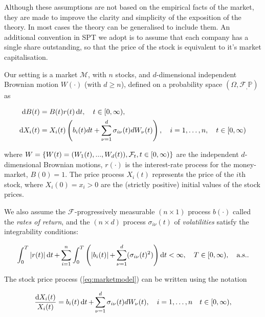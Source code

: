 \documentclass[british]{amsart} \usepackage{lmodern}
\numberwithin{equation}{section} \numberwithin{figure}{section}
\theoremstyle{plain} \newtheorem{thm}{\protect\theoremname}[section]
\theoremstyle{definition} \newtheorem{defn}[thm]{\protect\definitionname}
\theoremstyle{plain} \newtheorem{assumption}[thm]{\protect\assumptionname}
\theoremstyle{plain} \newtheorem{lem}[thm]{\protect\lemmaname}
\theoremstyle{plain} \newtheorem{prop}[thm]{\protect\propositionname}
\theoremstyle{remark} \newtheorem{rem}[thm]{\protect\remarkname}
\theoremstyle{plain} \newtheorem{cor}[thm]{\protect\corollaryname}
\renewcommand{\d}[1]{\mathop{\mathrm{d}{#1}}}
\newcommand{\filtration}[1]{\mathcal{F}_{#1}}
\newcommand{\abs}[1]{\mathop{|{#1}|}} \newcommand{\market}{\mathcal{M}}
\newcommand{\rangei}{i=1,\dots,n} \newcommand{\measure}{\mathbb{P}}
\newcommand{\probabilityspace}{(\Omega,\filtration,\measure)}
\begin{document}
Although these assumptions are not based on the empirical facts of the market,
they are made to improve the clarity and simplicity of the exposition of the
theory. In most cases the theory can be generalised to include them. An
additional convention in SPT we adopt is to assume that each company has a
single share outstanding, so that the price of the stock is equivalent to it's
market capitalisation.

Our setting is a market $\market$, with $n$ stocks, and $d$-dimensional
independent Brownian motion $W(\cdot)$ (with $d \ge n$), defined on a
probability space $\probabilityspace$ as

\begin{gather}
  \label{eq:marketmodel}
  \begin{split}
    \d{B(t)} &= B(t)r(t)\d{t},  
      \quad \ranget, \\
    \d{X_{i}(t)} &= 
          X_{i}(t) 
          \left(
              b_{i}(t)dt + \sum_{\nu=1}^{d} \sigma_{i\nu}(t) dW_{\nu}(t)
          \right),
      \quad \rangei,
      \quad \ranget
  \end{split}
\end{gather}

where $W = \left\{ W(t)=(W_{1}(t),...,W_{d}(t)),\filtration{t},\ranget \right\}$
are the independent $d$-dimensional Brownian motions, $r(\cdot)$ is the
interest-rate process for the money-market, $B(0)=1$. The price process
$X_{i}(t)$ represents the price of the $i$th stock, where $X_{i}(0) = x_{i} > 0$
are the (strictly positive) initial values of the stock prices.

We also assume the $\filtration{}$-progressively measurable $(n \times 1)$
process $b(\cdot)$ called the \textit{rates of return}, and the $(n \times d)$
process $\sigma_{i\nu}(t)$ of \textit{volatilities} satisfy the integrability
conditions: 

\begin{equation*}
  \int_{0}^{T} 
  \abs{r(t)} 
  \d{t} +
  \sum_{i=1}^{n} \int_{0}^{T} 
    \left( 
        \abs{b_{i}(t)} +
        \sum_{\nu=1}^{d} ( \sigma_{i\nu}(t)^2  ) 
        \right) \d{t} < \infty,
  \quad T \in [0, \infty),
  \quad \almostsurely.
  \end{equation*}


The stock price process (\ref{eq:marketmodel}) can be written using the notation 

\begin{equation}
  \label{eq:stockpriceprocessdiff}
    \frac{\d{X_{i}(t)}}{X_{i}(t)} = b_{i}(t)\d{t} + \sum_{\nu=1}^{d} \sigma_{i\nu}(t) dW_{\nu}(t),
  \quad \rangei
  \quad \ranget,
\end{equation}
\end{document}
